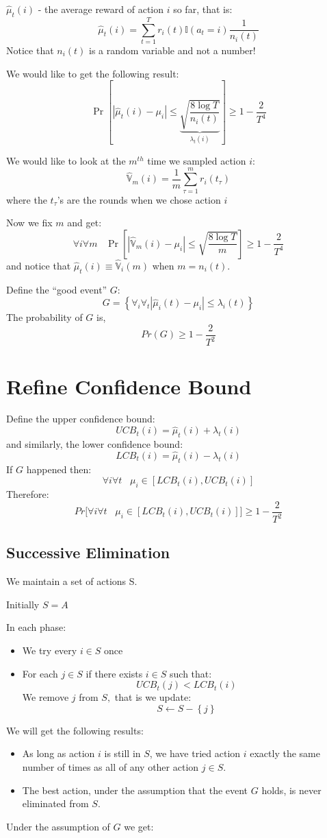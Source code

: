 $\hat{\mu}_{t}(i)$ - the average reward of action $i$ so far, that
is:
\[
\hat{\mu}_{t}(i)={\displaystyle
\sum_{t=1}^{T}r_{i}(t)}\mathbb{I}\left(a_{t}=i\right)\frac{1}{n_{i}(t)}
\]
Notice that $n_{i}(t)$ is a random variable and not a number!

We would like to get the following result:
\[
\Pr\left[\left|\hat{\mu}_{t}(i)-\mu_{i}\right|\le\underbrace{\sqrt{\frac{8\log
T}{n_{i}(t)}}}_{\lambda_{t}(i)}\right]\ge1-\frac{2}{T^{4}}
\]

We would like to look at the $m^{th}$ time we sampled action $i$:
\[
\hat{\mathbb{V}}_{m}(i)=\frac{1}{m} \sum_{\tau=1}^{m}r_{i}(t_{\tau})
\]
where the $t_{\tau}$'s are the rounds when we chose action $i$

Now we fix $m$ and get:
\[
\forall{i}\forall{m}\;\;\;
\Pr\left[\left|\hat{\mathbb{V}}_{m}(i)-\mu_{i}\right|\le\sqrt{\frac{8\log
T}{m}}\right]\ge1-\frac{2}{T^{4}}
\]
and notice that $\hat{\mu}_{t}(i)\equiv\hat{\mathbb{V}}_{i}(m)$ when
$m=n_{i}(t)$.

Define the ``good event'' $G$:
\[
G=\left\{ \forall_{i}\forall_{t}\left|\hat{\mu}_{i}(t)-\mu_{i}\right|\le\lambda_{i}(t)\right\}
\]
The probability of $G$ is,
\[
Pr\left(G\right)\ge1-\frac{2}{T^{2}}
\]

\section{Refine Confidence Bound}

Define the upper confidence bound:
\[
UCB_{t}(i)=\hat{\mu}_{t}(i)+\lambda_{t}(i)
\]
and similarly, the lower confidence bound:
\[
LCB_{t}(i)=\hat{\mu}_{t}(i)-\lambda_{t}(i)
\]
If $G$ happened then:
\[
\forall{i}\forall{t}\;\;\;\mu_{i}\in\left[LCB_{t}(i),UCB_{t}(i)\right]
\]
Therefore:
\[
Pr\biggl[\forall{i}\forall{t}\;\;\;
\mu_{i}\in\left[LCB_{t}(i),UCB_{t}(i)\right]\biggr]\ge1-\frac{2}{T^{2}}
\]

\subsection{Successive Elimination}

We maintain a set of actions S.

Initially $S=A$

In each phase:
\begin{itemize}
\item We try every $i\in S$ once
\item For each $j\in S$ if there exists $i\in S$ such that:
\[
UCB_{t}(j)<LCB_{t}(i)
\]
 We remove $j$ from $S,$ that is we update:
\[
S\leftarrow S-\left\{ j\right\}
\]
\end{itemize}
We will get the following results:
\begin{itemize}
\item As long as action $i$ is still in $S$, we have tried action $i$ exactly the
same number of times as all of any other action $j\in S$.
\item The best action, under the assumption that the event $G$ holds, is never eliminated
from $S$.
\end{itemize}
Under the assumption of $G$ we get:

